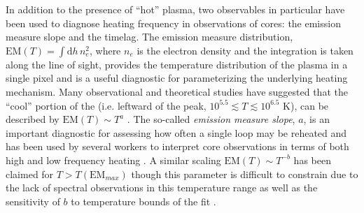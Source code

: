 In addition to the presence of ``hot'' plasma, two observables in particular have been used to diagnose heating frequency in observations of \AR{} cores: the emission measure slope and the timelag.  The emission measure distribution, $\mathrm{EM}(T)=\int\mathrm{d}h\,n_e^2$, where $n_e$ is the electron density and the integration is taken along the line of sight, provides the temperature distribution of the plasma in a single pixel and is a useful diagnostic for parameterizing the underlying heating mechanism. Many observational and theoretical studies have suggested that the ``cool'' portion of the \dem{} (i.e. leftward of the peak, $10^{5.5}\lesssim T\lesssim10^{6.5}$ K), can be described by $\mathrm{EM}(T)\sim T^a$ \citep{jordan_structure_1976,cargill_implications_1994,cargill_nanoflare_2004,warren_systematic_2012}. The so-called \textit{emission measure slope}, $a$, is an important diagnostic for assessing how often a single loop may be reheated and has been used by several workers to interpret \AR{} core observations in terms of both high and low frequency heating \citep[see Table 3 of][and references therin]{bradshaw_diagnosing_2012}. A similar scaling $\mathrm{EM}(T)\sim T^{-b}$ has been claimed for $T>T(\mathrm{EM}_{max})$ though this parameter is difficult to constrain due to the lack of spectral observations in this temperature range \citep{winebarger_defining_2012} as well as the sensitivity of $b$ to temperature bounds of the fit \citep[see section 3.3.1 of][]{barnes_inference_2016-1}.

